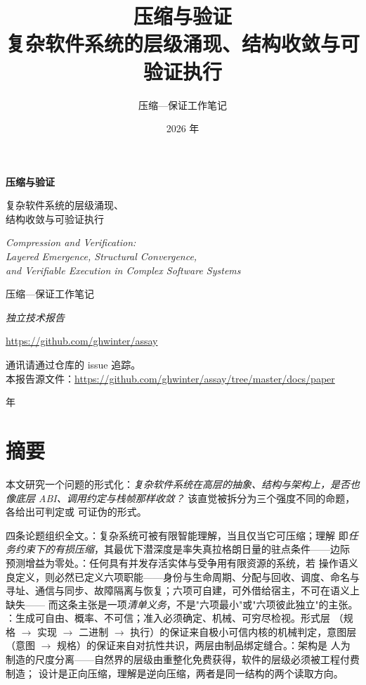 \documentclass[UTF8,a4paper,11pt,openany,oneside]{ctexbook}
\title{\bfseries 压缩与验证\\[0.4em]
       \large 复杂软件系统的层级涌现、结构收敛与可验证执行}
\author{压缩—保证工作笔记}
\date{2026 年}
\begin{document}
\frontmatter

\begin{titlepage}
\centering
\vspace*{2.2cm}
{\Huge\bfseries 压缩与验证\par}
\vspace{0.9cm}
{\LARGE 复杂软件系统的层级涌现、\\[0.35em] 结构收敛与可验证执行\par}
\vspace{1.6cm}
{\large\itshape Compression and Verification:\\[0.3em]
 Layered Emergence, Structural Convergence,\\[0.3em]
 and Verifiable Execution in Complex Software Systems\par}
\vspace{1.8cm}
{\large 压缩—保证工作笔记\par}
\vspace{0.45cm}
{\normalsize\itshape 独立技术报告\par}
\vspace{0.7cm}
{\small\url{https://github.com/ghwinter/assay}\par}
\vspace{0.25cm}
{\footnotesize 通讯请通过仓库的 issue 追踪。\\
 本报告源文件：\url{https://github.com/ghwinter/assay/tree/master/docs/paper}\par}
\vfill
{\normalsize{} 年\par}
\vspace{1.0cm}
\end{titlepage}

\chapter*{摘要}

本文研究一个问题的形式化：\emph{复杂软件系统在高层的抽象、结构与架构上，是否也像底层
ABI、调用约定与栈帧那样收敛？} 该直觉被拆分为三个强度不同的命题，各给出可判定或
可证伪的形式。

四条论题组织全文。：复杂系统可被有限智能理解，当且仅当它可压缩；理解
即\emph{任务约束下的有损压缩}，其最优下潜深度是率失真拉格朗日量的驻点条件——边际
预测增益为零处。：任何具有并发存活实体与受争用有限资源的系统，若
操作语义良定义，则必然已定义六项职能——身份与生命周期、分配与回收、调度、命名与
寻址、通信与同步、故障隔离与恢复；六项可自建，可外借给宿主，不可在语义上缺失——
而这条主张是一项\emph{清单义务}，不是"六项最小"或"六项彼此独立"的主张。
：生成可自由、概率、不可信；准入必须确定、机械、可穷尽检视。形式层
（规格 $\to$ 实现 $\to$ 二进制 $\to$ 执行）的保证来自极小可信内核的机械判定，意图层
（意图 $\to$ 规格）的保证来自对抗性共识，两层由制品绑定缝合。：架构是
人为制造的尺度分离——自然界的层级由重整化免费获得，软件的层级必须被工程付费制造；
设计是正向压缩，理解是逆向压缩，两者是同一结构的两个读取方向。
\end{document}
